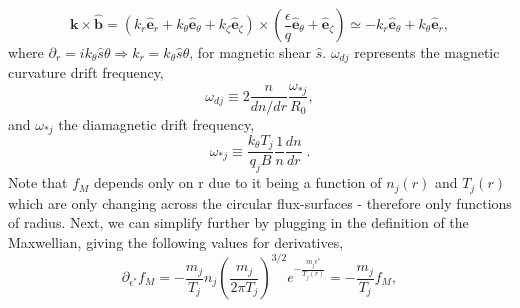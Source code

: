 \documentclass[12pt]{article}
\numberwithin{equation}{subsection}
\begin{document}
   \begin{equation}
      \bm{k}\times\bm{\hat{b}} = (k_r\bm{\hat{e}}_r + k_\theta\bm{\hat{e}}_\theta + k_\zeta\bm{\hat{e}}_\zeta)\times
      (\frac{\epsilon}{q}\bm{\hat{e}}_\theta + \bm{\hat{e}}_\zeta) \simeq -k_r\bm{\hat{e}}_\theta + k_\theta\bm{\hat{e}}_r,
   \end{equation}
where $\partial_r = i k_\theta\hat{s}\theta \Rightarrow k_r = k_\theta\hat{s}\theta$, for magnetic shear $\hat{s}$\cite{HC}. $\omega_{dj}$ represents
the magnetic curvature drift frequency,
   \begin{equation}
      \omega_{dj} \equiv 2\frac{n}{dn/dr}\frac{\omega_{*j}}{R_0},
   \end{equation}
and $\omega_{*j}$ the diamagnetic drift frequency,
   \begin{equation}
      \omega_{*j} \equiv \frac{k_\theta T_j}{q_j B}\frac{1}{n}\frac{dn}{dr}\;.
   \end{equation}
Note that $f_M$ depends only on r due to it being a function of $n_j(r)$ and $T_j(r)$ which are only changing across the circular
flux-surfaces - therefore only functions of radius. Next, we can simplify further by plugging in the definition of the Maxwellian,
giving the following values for derivatives,
   \begin{equation}
      \partial_{\epsilon^*}f_M = -\frac{m_j}{T_j}n_j\left(\frac{m_j}{2\pi T_j}\right)^{3/2}e^{-\frac{m_j \epsilon^*}{T_j(r)}} =
                                 -\frac{m_j}{T_j}f_M,
   \end{equation}
   
\end{document}
